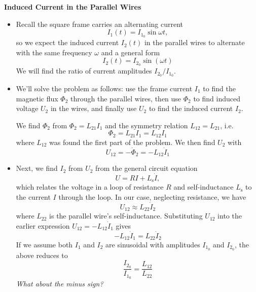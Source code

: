 \documentclass[11pt, a4paper]{article}
\begin{document}
\textbf{Induced Current in the Parallel Wires}
\begin{itemize}
	\item Recall the square frame carries an alternating current
	\begin{equation*}
		I_{1}(t) = I_{1_{0}}\sin \omega t,
	\end{equation*}
	so we expect the induced current $ I_{2}(t) $ in the parallel wires to alternate with the same frequency $ \omega $ and a general form
	\begin{equation*}
		I_{2}(t) = I_{2_{0}}\sin(\omega t)
	\end{equation*}
	We will find the ratio of current amplitudes $ I_{2_{0}} / I_{1_{0}} $.
	
	\item We'll solve the problem as follows: use the frame current $ I_{1} $ to find the magnetic flux $ \Phi_{2} $ through the parallel wires, then use $ \Phi_{2} $ to find induced voltage $ U_{2} $ in the wires, and finally use $ U_{2} $ to find the induced current $ I_{2} $.
	
	
	We find $ \Phi_{2} $ from $ \Phi_{2} = L_{21}I_{1} $ and the symmetry relation $ L_{12} = L_{21} $, i.e.
	\begin{equation*}
		\Phi_{2} = L_{21}I_{1} = L_{12} I_{1}
	\end{equation*}
	where $ L_{12} $ was found the first part of the problem. We then find $ U_{2} $ with
	\begin{equation*}
		U_{12} = - \dot{\Phi}_{2} = - L_{12}\dot{I}_{1}
	\end{equation*}
	
	\item Next, we find $ I_{2} $ from $ U_{2} $ from the general circuit equation
	\begin{equation*}
		U = RI + L_{\text{s}}\dot{I},
	\end{equation*}
	which relates the voltage in a loop of resistance $ R $ and self-inductance $ L_{\text{s}} $ to the current $ I $ through the loop. In our case, neglecting resistance, we have
	\begin{equation*}
		U_{12} \approx L_{22} \dot{I}_{2}
	\end{equation*}
	where $ L_{22} $ is the parallel wire's self-inductance. Substituting $ U_{12} $ into the earlier expression $ U_{12} = -L_{12}\dot{I}_{1} $ gives
	\begin{equation*}
		-L_{12} \dot{I}_{1} = L_{22}\dot{I}_{2} 
	\end{equation*}
	If we assume both $ I_{1} $ and $ I_{2} $ are sinusoidal with amplitudes $ I_{1_{0}} $ and $ I_{2_{0}} $, the above reduces to
	\begin{equation*}
		\frac{I_{2_{0}}}{I_{1_{0}}} = \frac{L_{12}}{L_{22}}
	\end{equation*}
	\textit{What about the minus sign?}
	

\end{itemize}
\end{document}
